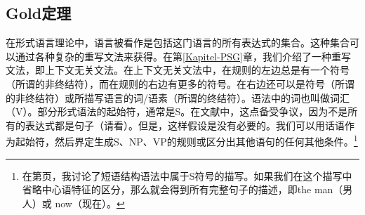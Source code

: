 \subsection{Gold定理}
\label{Abschnitt-Golds-Theorem}

在形式语言理论中，语言被看作是包括这门语言的所有表达式的集合。这种集合可以通过各种复杂的重写文法来获得。在第\ref{Kapitel-PSG}章，我们介绍了一种重写文法，即上下文无关文法。在上下文无关文法中，在规则的左边总是有一个符号（所谓的非终结符），而在规则的右边有更多的符号。在右边还可以是符号（所谓的非终结符）或所描写语言的词/语素（所谓的终结符）。语法中的词也叫做词汇（V）。部分形式语法的起始符，通常是S。在文献中，这点备受争议，因为不是所有的表达式都是句子（请看\citealp[]{Deppermann2006a}）。但是，这样假设是没有必要的。我们可以用话语作为起始符，然后界定生成S、NP、VP的规则或区分出其他语句的任何其他条件。\footnote{%
在第\pageref{HPSG-Rootnode}页，我讨论了短语结构语法中属于S符号的描写。如果我们在这个描写中省略中心语特征的区分，那么就会得到所有完整句子的描述，即the man（男人）或 now（现在）。
}

